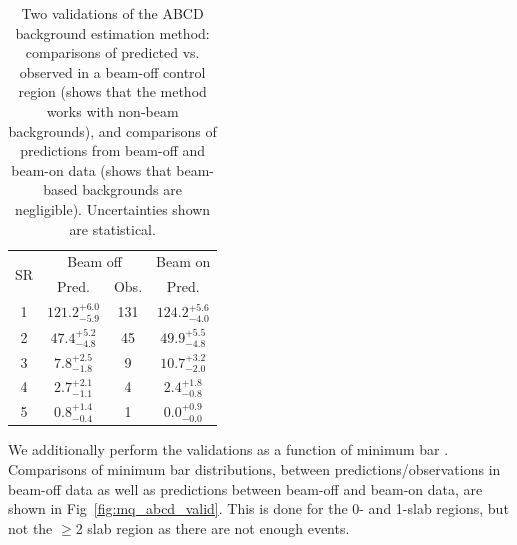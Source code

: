 {\begin{table}[t]
\caption{Two validations of the ABCD background estimation method:
comparisons of predicted vs. observed in a beam-off control region
(shows that the method works with non-beam backgrounds), and comparisons
of predictions from beam-off and beam-on data (shows that beam-based
backgrounds are negligible). Uncertainties shown are statistical.
\label{tab:mq_abcd_valid}}
\centering
\renewcommand{\arraystretch}{1.3}
\begin{tabular}{c|cc|c}
\hline
\multirow{2}{*}{SR} & \multicolumn{2}{c|}{Beam off} & Beam on \\
 & Pred. & Obs. & Pred. \\
\hline
1 & $121.2^{+6.0}_{-5.9}$ & 131 & $124.2^{+5.6}_{-4.0}$ \\
2 & $47.4^{+5.2}_{-4.8}$ & 45 & $49.9^{+5.5}_{-4.8}$ \\
3 & $7.8^{+2.5}_{-1.8}$ & 9 & $10.7^{+3.2}_{-2.0}$ \\
4 & $2.7^{+2.1}_{-1.1}$ & 4 & $2.4^{+1.8}_{-0.8}$ \\
5 & $0.8^{+1.4}_{-0.4}$ & 1 & $0.0^{+0.9}_{-0.0}$ \\
\hline
\end{tabular}
\end{table}

We additionally perform the validations as a function of minimum bar \Npe. Comparisons of
minimum bar \Npe distributions, between predictions/observations in beam-off data
as well as predictions between beam-off and beam-on data, are shown in 
Fig~\ref{fig:mq_abcd_valid}. This is done for the 0- and 1-slab regions,
but not the $\geq$2 slab region as there are not enough events.

}
